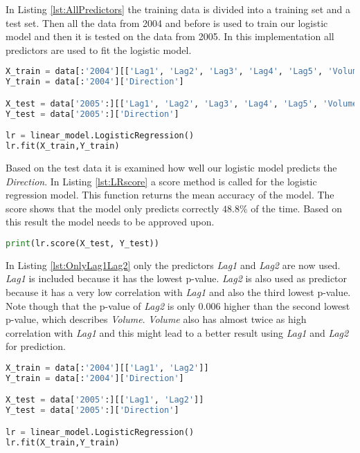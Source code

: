 In Listing \ref{lst:AllPredictors} the training data is divided into a training set and a test set. Then all the data from 2004 and before is used to train our logistic model and then it is tested on the data from 2005. In this implementation all predictors are used to fit the logistic model.

\begin{lstlisting}[language=Python, label=lst:AllPredictors, caption=Logistic regression using all predictors]
X_train = data[:'2004'][['Lag1', 'Lag2', 'Lag3', 'Lag4', 'Lag5', 'Volume']]
Y_train = data[:'2004']['Direction']

X_test = data['2005':][['Lag1', 'Lag2', 'Lag3', 'Lag4', 'Lag5', 'Volume']]
Y_test = data['2005':]['Direction']

lr = linear_model.LogisticRegression()
lr.fit(X_train,Y_train)
\end{lstlisting}

Based on the test data it is examined how well our logistic model predicts the \emph{Direction}. In Listing \ref{lst:LRscore} a score method is called for the logistic regression model. This function returns the mean accuracy of the model. The score shows that the model only predicts correctly $48.8\%$ of the time. Based on this result the model needs to be approved upon.
\begin{lstlisting}[language=Python, label=lst:LRscore, caption=Printing mean accuracy]
print(lr.score(X_test, Y_test))
\end{lstlisting}

In Listing \ref{lst:OnlyLag1Lag2} only the predictors \emph{Lag1} and \emph{Lag2} are now used. \emph{Lag1} is included because it has the lowest p-value. \emph{Lag2} is also used as predictor because it has a very low correlation with \emph{Lag1} and also the third lowest p-value.
Note though that the p-value of \emph{Lag2} is only 0.006 higher than the second lowest p-value, which describes \emph{Volume}. \emph{Volume} also has almost twice as high correlation with \emph{Lag1} and this might lead to a better result using \emph{Lag1} and \emph{Lag2} for prediction.

\begin{lstlisting}[language=Python, label=lst:OnlyLag1Lag2, caption=Logistic regression using only Lag1 and Lag2 as predictors]
X_train = data[:'2004'][['Lag1', 'Lag2']]
Y_train = data[:'2004']['Direction']

X_test = data['2005':][['Lag1', 'Lag2']]
Y_test = data['2005':]['Direction']

lr = linear_model.LogisticRegression()
lr.fit(X_train,Y_train)
\end{lstlisting}

